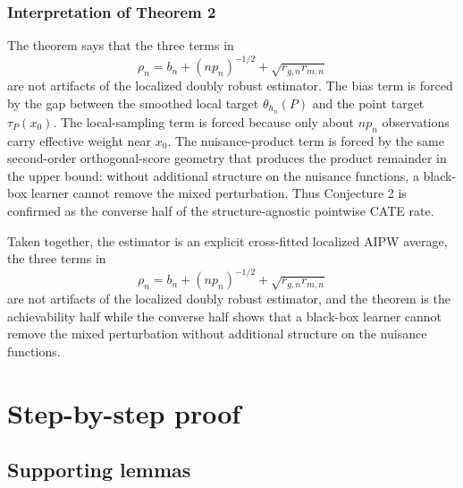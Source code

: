 \documentclass[11pt]{article}
\theoremstyle{definition}
\theoremstyle{plain}
\theoremstyle{remark}
\begin{document}
\subsubsection*{Interpretation of Theorem 2}
The theorem says that the three terms in
\[
  \rho_n=b_n+(n p_n)^{-1/2}+\sqrt{r_{g,n}r_{m,n}}
\]
are not artifacts of the localized doubly robust estimator. The bias term is forced by the gap between the smoothed local target $\theta_{h_n}(P)$ and the point target $\tau_P(x_0)$. The local-sampling term is forced because only about $n p_n$ observations carry effective weight near $x_0$. The nuisance-product term is forced by the same second-order orthogonal-score geometry that produces the product remainder in the upper bound: without additional structure on the nuisance functions, a black-box learner cannot remove the mixed perturbation. Thus Conjecture 2 is confirmed as the converse half of the structure-agnostic pointwise CATE rate.

Taken together, the estimator is an explicit cross-fitted localized AIPW average, the three terms in
\[
  \rho_n=b_n+(n p_n)^{-1/2}+\sqrt{r_{g,n}r_{m,n}}
\]
are not artifacts of the localized doubly robust estimator, and the theorem is the achievability half while the converse half shows that a black-box learner cannot remove the mixed perturbation without additional structure on the nuisance functions.

\section{Step-by-step proof}
\subsection*{Supporting lemmas}
\end{document}
